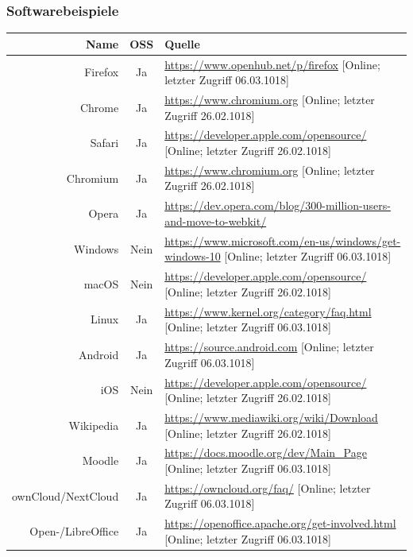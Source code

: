 \documentclass[a4paper]{article}
\begin{document}
			 \subsubsection{Softwarebeispiele}
			     \begin{table}[!htbp]
			         \centering
			         \begin{tabularx}{\textwidth}{rcX}
			               Name & OSS & Quelle\\\hline\hline
			               Firefox & Ja & \tiny\url{https://www.openhub.net/p/firefox} [Online; letzter Zugriff 06.03.1018] \\
			               Chrome & Ja & \tiny\url{https://www.chromium.org} [Online; letzter Zugriff 26.02.1018] \\
			               Safari & Ja & \tiny\url{https://developer.apple.com/opensource/} [Online; letzter Zugriff 26.02.1018]\\
			               Chromium & Ja & \tiny\url{https://www.chromium.org} [Online; letzter Zugriff 26.02.1018] \\
			               Opera & Ja & \tiny\url{https://dev.opera.com/blog/300-million-users-and-move-to-webkit/}\\\hline
			               Windows & Nein & \tiny\url{https://www.microsoft.com/en-us/windows/get-windows-10} [Online; letzter Zugriff 06.03.1018]\\
			               macOS & Nein & \tiny\url{https://developer.apple.com/opensource/} [Online; letzter Zugriff 26.02.1018] \\
			               Linux & Ja & \tiny\url{https://www.kernel.org/category/faq.html} [Online; letzter Zugriff 06.03.1018] \\
			               Android & Ja & \tiny\url{https://source.android.com} [Online; letzter Zugriff 06.03.1018] \\
			               iOS & Nein & \tiny\url{https://developer.apple.com/opensource/} [Online; letzter Zugriff 26.02.1018] \\\hline
			               Wikipedia & Ja & \tiny\url{https://www.mediawiki.org/wiki/Download} [Online; letzter Zugriff 26.02.1018]\\
			               Moodle & Ja & \tiny\url{https://docs.moodle.org/dev/Main_Page} [Online; letzter Zugriff 06.03.1018] \\
			               ownCloud/NextCloud & Ja & \tiny\url{https://owncloud.org/faq/} [Online; letzter Zugriff 06.03.1018] \\\hline
			               Open-/LibreOffice & Ja & \tiny\url{https://openoffice.apache.org/get-involved.html} [Online; letzter Zugriff 06.03.1018] \\

\end{tabularx}
\end{table}
\end{document}

